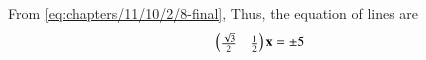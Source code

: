 			From 
\eqref{eq:chapters/11/10/2/8-final},
		Thus, the equation of lines are
\begin{align}
	\begin{pmatrix}\frac{\sqrt{3}}{2}& \frac{1}{2}\end{pmatrix}\mathbf{x}=\pm5
\end{align}

